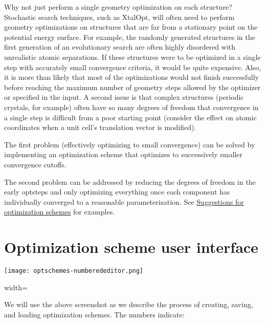 Why not just perform a single geometry optimization on each structure? Stochastic search techniques, such as Xtal\-Opt, will often need to perform geometry optimizations on structures that are far from a stationary point on the potential energy surface. For example, the randomly generated structures in the first generation of an evolutionary search are often highly disordered with unrealistic atomic separations. If these structures were to be optimized in a single step with accurately small convergence criteria, it would be quite expensive. Also, it is more than likely that most of the optimizations would not finish successfully before reaching the maximum number of geometry steps allowed by the optimizer or specified in the input. A second issue is that complex structures (periodic crystals, for example) often have so many degrees of freedom that convergence in a single step is difficult from a poor starting point (consider the effect on atomic coordinates when a unit cell's translation vector is modified).

The first problem (effectively optimizing to small convergence) can be solved by implementing an optimization scheme that optimizes to successively smaller convergence cutoffs.

The second problem can be addressed by reducing the degrees of freedom in the early optsteps and only optimizing everything once each component has individually converged to a reasonable parameterization. See \hyperlink{optschemes_suggest}{Suggestions for optimization schemes} for examples.\hypertarget{optschemes_gui}{}\section{Optimization scheme user interface}\label{optschemes_gui}
 
\begin{DoxyImage}
\texttt{[image: optschemes-numberededitor.png]}
\caption{width=}
\end{DoxyImage}


We will use the above screenshot as we describe the process of creating, saving, and loading optimization schemes. The numbers indicate\-:


